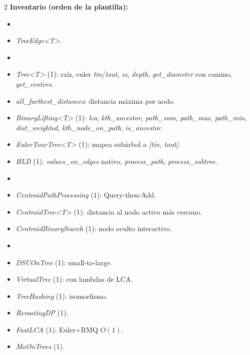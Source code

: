 \documentclass[10pt]{article}
\begin{document}
\begin{multicols}{2}
\textbf{Inventario (orden de la plantilla):}
\begin{itemize}\setlength{\itemsep}{1pt}
  \item[\textbf{Internas}]
  \item \textit{TreeEdge<T>}.
  \item[\textbf{Árbol base}]
  \item \textit{Tree<T>} (1): raíz, euler \textit{tin}/\textit{tout}, \textit{sz}, \textit{depth}, \textit{get\_diameter} con camino, \textit{get\_centers}.
  \item \textit{all\_farthest\_distances}: distancia máxima por nodo.
  \item \textit{BinaryLifting<T>} (1): \textit{lca}, \textit{kth\_ancestor}, \textit{path\_sum}, \textit{path\_max}, \textit{path\_min}, \textit{dist\_weighted}, \textit{kth\_node\_on\_path}, \textit{is\_ancestor}.
  \item \textit{EulerTourTree<T>} (1): mapea subárbol a \textit{[tin, tout]}.
  \item \textit{HLD} (1): \textit{values\_on\_edges} nativo, \textit{process\_path}, \textit{process\_subtree}.
  \item[\textbf{Centroid}]
  \item \textit{CentroidPathProcessing} (1): Query-then-Add.
  \item \textit{CentroidTree<T>} (1): distancia al nodo activo más cercano.
  \item \textit{CentroidBinarySearch} (1): nodo oculto interactivo.
  \item[\textbf{Subárboles y caminos}]
  \item \textit{DSUOnTree} (1): small-to-large.
  \item \textit{VirtualTree} (1): con lambdas de LCA.
  \item \textit{TreeHashing} (1): isomorfismo.
  \item \textit{RerootingDP} (1).
  \item \textit{FastLCA} (1): Euler+RMQ $O(1)$.
  \item \textit{MoOnTrees} (1).
\end{itemize}


\end{multicols}
\end{document}
